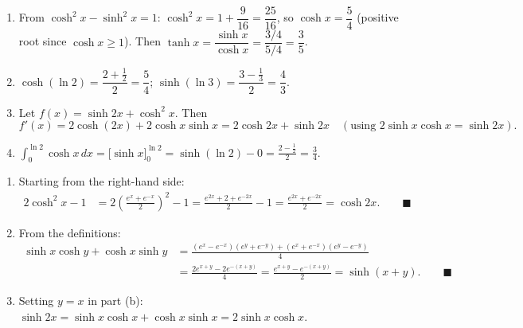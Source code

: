 \documentclass[11pt]{article}
\begin{document}
\begin{corrige}
\begin{enumerate}
\item From $\cosh^2 x - \sinh^2 x = 1$: $\cosh^2 x = 1 + \dfrac{9}{16} = \dfrac{25}{16}$, so $\cosh x = \dfrac{5}{4}$ (positive root since $\cosh x \geq 1$). Then $\tanh x = \dfrac{\sinh x}{\cosh x} = \dfrac{3/4}{5/4} = \dfrac{3}{5}$.
\item $\cosh(\ln 2) = \dfrac{2 + \tfrac{1}{2}}{2} = \dfrac{5}{4}$; \quad $\sinh(\ln 3) = \dfrac{3 - \tfrac{1}{3}}{2} = \dfrac{4}{3}$.
\item Let $f(x) = \sinh 2x + \cosh^2 x$. Then
\[ f'(x) = 2\cosh(2x) + 2\cosh x \sinh x = 2\cosh 2x + \sinh 2x \quad (\text{using } 2\sinh x\cosh x = \sinh 2x). \]
\item $\displaystyle\int_0^{\ln 2} \cosh x\, dx = \big[\sinh x\big]_0^{\ln 2} = \sinh(\ln 2) - 0 = \frac{2 - \tfrac{1}{2}}{2} = \frac{3}{4}$.
\end{enumerate}
\end{corrige}

\begin{corrige}
\begin{enumerate}
\item Starting from the right-hand side:
\begin{align*}
2\cosh^2 x - 1 &= 2\left(\frac{e^x + e^{-x}}{2}\right)^2 - 1 = \frac{e^{2x} + 2 + e^{-2x}}{2} - 1 = \frac{e^{2x} + e^{-2x}}{2} = \cosh 2x. \qquad \blacksquare
\end{align*}
\item From the definitions:
\begin{align*}
\sinh x \cosh y + \cosh x \sinh y &= \frac{(e^x - e^{-x})(e^y + e^{-y}) + (e^x + e^{-x})(e^y - e^{-y})}{4} \\
&= \frac{2e^{x+y} - 2e^{-(x+y)}}{4} = \frac{e^{x+y} - e^{-(x+y)}}{2} = \sinh(x+y). \qquad \blacksquare
\end{align*}
\item Setting $y = x$ in part (b): $\sinh 2x = \sinh x \cosh x + \cosh x \sinh x = 2\sinh x \cosh x$.
\end{enumerate}
\end{corrige}
\end{document}
